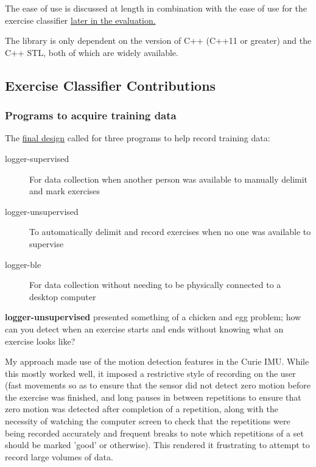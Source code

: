 \documentclass[a4paper]{article}
\begin{document}
The ease of use is discussed at length in combination with the ease of use for the exercise classifier \hyperref[subsec:ev_eu]{later in the evaluation.}

The library is only dependent on the version of C++ (C++11 or greater) and the C++ STL, both of which are widely available. 

\subsection{Exercise Classifier Contributions}%
\label{subsec:ev_cl}

\subsubsection{Programs to acquire training data}
\label{subsubsec:ev_cl_training}

The \hyperref[subsec:dc_msa]{final design} called for three programs to help record training data:

\begin{description}
\item[logger-supervised] For data collection when another person was available to manually delimit and mark exercises
\item[logger-unsupervised] To automatically delimit and record exercises when no one was available to supervise
\item[logger-ble] For data collection without needing to be physically connected to a desktop computer
\end{description}

\label{para:ev_cl_loggerunsupervised}
\textbf{logger-unsupervised} presented something of a chicken and egg problem; how can you detect when an exercise starts and ends without knowing what an exercise looks like?

My approach made use of the motion detection features in the Curie IMU. 
While this mostly worked well, it imposed a restrictive style of recording on the user (fast movements so as to ensure that the sensor did not detect zero motion before the exercise was finished, and long pauses in between repetitions to ensure that zero motion was detected after completion of a repetition, along with the necessity of watching the computer screen to check that the repetitions were being recorded accurately and frequent breaks to note which repetitions of a set should be marked 'good' or otherwise). This rendered it frustrating to attempt to record large volumes of data.
\end{document}
